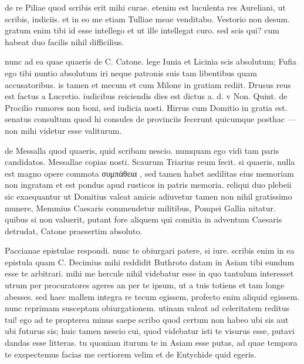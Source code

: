  de re Piliae quod scribis erit mihi curae. etenim est luculenta res Aureliani, ut scribis, indiciis. et in eo me etiam Tulliae meae venditabo. Vestorio non desum. gratum enim tibi id esse intellego et ut ille intellegat curo. sed scis qui? cum habeat duo facilis nihil difficilius.

 nunc ad ea quae quaeris de C. Catone. lege Iunia et Licinia scis absolutum; Fufia ego tibi nuntio absolutum iri neque patronis suis tam libentibus quam accusatoribus. is tamen et mecum et cum Milone in gratiam rediit. Drusus reus est factus a Lucretio. iudicibus reiciendis dies est dictus a. d. v Non. Quint. de Procilio rumores non boni, sed iudicia nosti. Hirrus cum Domitio in gratia est. senatus consultum quod hi consules de provinciis fecerunt quicumque posthac — non mihi videtur esse valiturum.

 de Messalla quod quaeris, quid scribam nescio. numquam ego vidi tam paris candidatos. Messallae copias nosti. Scaurum Triarius reum fecit. si quaeris, nulla est magno opere commota συμπάθεια , sed tamen habet aedilitas eius memoriam non ingratam et est pondus apud rusticos in patris memoria. reliqui duo plebeii sic exaequantur ut Domitius valeat amicis adiuvetur tamen non nihil gratissimo munere, Memmius Caesaris commendetur militibus, Pompei Gallia nitatur. quibus si non valuerit, putant fore aliquem qui comitia in adventum Caesaris detrudat, Catone praesertim absoluto.

 Paccianae epistulae respondi. nunc te obiurgari patere, si iure. scribis enim in ea epistula quam C. Decimius mihi reddidit Buthroto datam in Asiam tibi eundum esse te arbitrari. mihi me hercule nihil videbatur esse in quo tantulum interesset utrum per procuratores ageres an per te ipsum, ut a tuis totiens et tam longe abesses. sed haec mallem integra re tecum egissem, profecto enim aliquid egissem. nunc reprimam susceptam obiurgationem. utinam valeat ad celeritatem reditus tui! ego ad te propterea minus saepe scribo quod certum non habeo ubi sis aut ubi futurus sis; huic tamen nescio cui, quod videbatur isti te visurus esse, putavi dandas esse litteras. tu quoniam iturum te in Asiam esse putas, ad quae tempora te exspectemus facias me certiorem velim et de Eutychide quid egeris.
